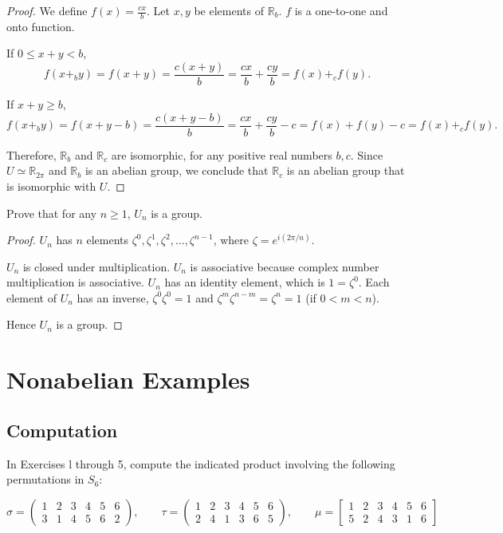 \begin{proof}
    We define $f(x) = \frac{cx}{b}$. Let $x, y$ be elements of $\mathbb{R}_{b}$. $f$ is a one-to-one and onto function.

    If $0\le x + y < b$,
    \[
        f(x {+}_{b} y) = f(x + y) = \frac{c(x+y)}{b} = \frac{cx}{b} + \frac{cy}{b} = f(x) {+}_{c} f(y).
    \]

    If $x + y \ge b$,
    \[
        f(x {+}_{b} y) = f(x + y - b) = \frac{c(x + y - b)}{b} = \frac{cx}{b} + \frac{cy}{b} - c = f(x) + f(y) - c = f(x) {+}_{c} f(y).
    \]

    Therefore, $\mathbb{R}_{b}$ and $\mathbb{R}_{c}$ are isomorphic, for any positive real numbers $b, c$. Since $U\simeq\mathbb{R}_{2\pi}$ and $\mathbb{R}_{b}$ is an abelian group, we conclude that $\mathbb{R}_{c}$ is an abelian group that is isomorphic with $U$.
\end{proof}

\begin{exercise}
    Prove that for any $n\geq 1$, $U_{n}$ is a group.
\end{exercise}

\begin{proof}
    $U_{n}$ has $n$ elements $\zeta^{0}, \zeta^{1}, \zeta^{2}, \ldots, \zeta^{n-1}$, where $\zeta = e^{i(2\pi/n)}$.

    $U_{n}$ is closed under multiplication. $U_{n}$ is associative because complex number multiplication is associative. $U_{n}$ has an identity element, which is $1 = \zeta^{0}$. Each element of $U_{n}$ has an inverse, $\zeta^{0}\zeta^{0} = 1$ and $\zeta^{m}\zeta^{n-m} = \zeta^{n} = 1$ (if $0 < m < n$).

    Hence $U_{n}$ is a group.
\end{proof}

\section{Nonabelian Examples}
\setcounter{exercise}{0}

\subsection*{Computation}

In Exercises l through 5, compute the indicated product involving the following permutations in $S_{6}$:

\[
    \sigma = \begin{pmatrix}
        1 & 2 & 3 & 4 & 5 & 6 \\
        3 & 1 & 4 & 5 & 6 & 2
    \end{pmatrix},
    \qquad
    \tau = \begin{pmatrix}
        1 & 2 & 3 & 4 & 5 & 6 \\
        2 & 4 & 1 & 3 & 6 & 5
    \end{pmatrix},
    \qquad
    \mu = \begin{bmatrix}
        1 & 2 & 3 & 4 & 5 & 6 \\
        5 & 2 & 4 & 3 & 1 & 6
    \end{bmatrix}
\]

